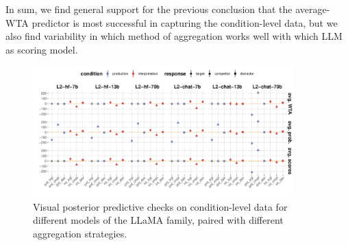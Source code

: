 \documentclass[fleqn]{article}
\begin{document}


In sum, we find general support for the previous conclusion that the average-WTA predictor is most successful in capturing the condition-level data, but we also find variability in which method of aggregation works well with which LLM as scoring model.

\begin{figure}[t]
  \centering
  \includegraphics[width=0.9\textwidth]{00-pics/vPPC_all_LLaMA_models.pdf}
  \caption{Visual posterior predictive checks on condition-level data for different models of the LLaMA family, paired with different aggregation strategies.}
  \label{fig:LLaMA-results-vPPC}
\end{figure}
\end{document}
